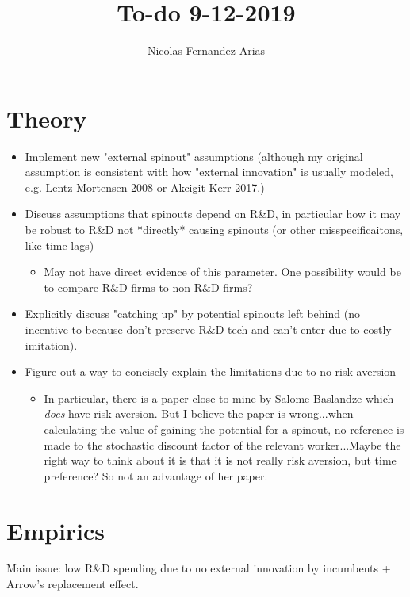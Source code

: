 \documentclass[12pt,english]{article}
\theoremstyle{remark}
\begin{document}
	
\title{To-do 9-12-2019}
\author{Nicolas Fernandez-Arias}
\maketitle

\section{Theory}

\begin{itemize}
	\item Implement new "external spinout" assumptions (although my original assumption is consistent with how "external innovation" is usually modeled, e.g. Lentz-Mortensen 2008 or Akcigit-Kerr 2017.)
	\item Discuss assumptions that spinouts depend on R\&D, in particular how it may be robust to R\&D not *directly* causing spinouts (or other misspecificaitons, like time lags)
	\begin{itemize}
		\item May not have direct evidence of this parameter. One possibility would be to compare R\&D firms to non-R\&D firms?
	\end{itemize}
	\item Explicitly discuss "catching up" by potential spinouts left behind (no incentive to because don't preserve R\&D tech and can't enter due to costly imitation).
	\item Figure out a way to concisely explain the limitations due to no risk aversion
	\begin{itemize}
		\item In particular, there is a paper close to mine by Salome Baslandze which \textit{does} have risk aversion. But I believe the paper is wrong...when calculating the value of gaining the potential for a spinout, no reference is made to the stochastic discount factor of the relevant worker...Maybe the right way to think about it is that it is not really risk aversion, but time preference? So not an advantage of her paper.
	\end{itemize}
\end{itemize}

\section{Empirics}

Main issue: low R\&D spending due to no external innovation by incumbents + Arrow's replacement effect.
\end{document}
